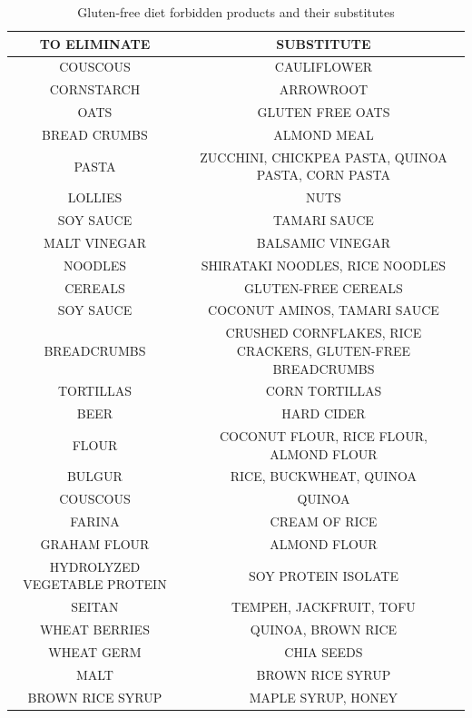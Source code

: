 \begin{table}[H]
\centering
\scriptsize
\begin{tabular}{|c|c|}
\hline
\textbf{TO ELIMINATE} & \textbf{SUBSTITUTE} \\ \hline
COUSCOUS                     & CAULIFLOWER             \\ \hline
CORNSTARCH                  & ARROWROOT               \\ \hline
OATS                         & GLUTEN FREE  OATS       \\ \hline
BREAD CRUMBS                 & ALMOND MEAL             \\ \hline
PASTA                        & ZUCCHINI, CHICKPEA PASTA, QUINOA PASTA, CORN PASTA \\ \hline
LOLLIES                      & NUTS                    \\ \hline
SOY SAUCE                    & TAMARI SAUCE            \\ \hline
MALT VINEGAR                 & BALSAMIC VINEGAR        \\ \hline
NOODLES                      & SHIRATAKI NOODLES, RICE NOODLES      \\ \hline
CEREALS                      & GLUTEN-FREE CEREALS     \\ \hline
SOY SAUCE                    & COCONUT AMINOS, TAMARI SAUCE         \\ \hline
BREADCRUMBS                  & CRUSHED CORNFLAKES, RICE CRACKERS, GLUTEN-FREE BREADCRUMBS \\ \hline
TORTILLAS                    & CORN TORTILLAS          \\ \hline
BEER                         & HARD CIDER              \\ \hline
FLOUR                        & COCONUT FLOUR, RICE FLOUR, ALMOND FLOUR \\ \hline
BULGUR                       & RICE, BUCKWHEAT, QUINOA\\ \hline
COUSCOUS                     & QUINOA                  \\ \hline
FARINA                       & CREAM OF RICE           \\ \hline
GRAHAM FLOUR                 & ALMOND FLOUR            \\ \hline
HYDROLYZED VEGETABLE PROTEIN & SOY PROTEIN ISOLATE     \\ \hline
SEITAN                       & TEMPEH, JACKFRUIT, TOFU \\ \hline
WHEAT BERRIES                & QUINOA, BROWN RICE      \\ \hline
WHEAT GERM                   & CHIA SEEDS              \\ \hline
MALT                         & BROWN RICE SYRUP        \\ \hline
BROWN RICE SYRUP             & MAPLE SYRUP, HONEY       \\ \hline

\end{tabular}
\caption{Gluten-free diet forbidden products and their substitutes}
\label{tab:gluten}
\end{table}

